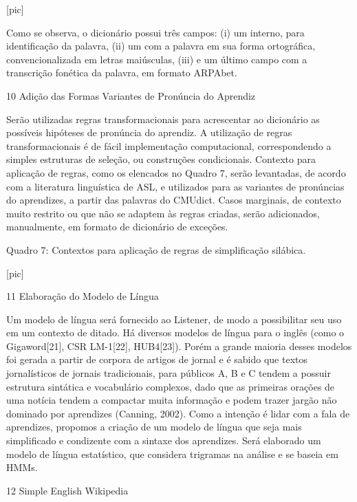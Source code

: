                                 [pic]

Como se observa, o dicion\'ario possui tr\^es campos: (i) um interno, para
identifica\c{c}\~ao da palavra, (ii) um com a palavra em sua forma
ortogr\'afica, convencionalizada em letras mai\'usculas, (iii) e um \'ultimo
campo com a transcri\c{c}\~ao fon\'etica da palavra, em formato ARPAbet.

10 Adi\c{c}\~ao das Formas Variantes de Pron\'uncia do Aprendiz

Ser\~ao utilizadas regras transformacionais para acrescentar ao dicion\'ario
as poss\'iveis hip\'oteses de pron\'uncia do aprendiz. A utiliza\c{c}\~ao de regras
transformacionais \'e de f\'acil implementa\c{c}\~ao computacional, correspondendo
a simples estruturas de sele\c{c}\~ao, ou constru\c{c}\~oes condicionais. Contexto
para aplica\c{c}\~ao de regras, como os elencados no Quadro 7, ser\~ao
levantadas, de acordo com a literatura lingu\'istica de ASL, e utilizados
para as variantes de pron\'uncias do aprendizes, a partir das palavras do
CMUdict. Casos marginais, de contexto muito restrito ou que n\~ao se
adaptem às regras criadas, ser\~ao adicionados, manualmente, em formato de
dicion\'ario de exce\c{c}\~oes.

Quadro 7: Contextos para aplica\c{c}\~ao de regras de simplifica\c{c}\~ao sil\'abica.

                                [pic]

11 Elabora\c{c}\~ao do Modelo de L\'ingua

Um modelo de l\'ingua ser\'a fornecido ao Listener, de modo a possibilitar
seu uso em um contexto de ditado. H\'a diversos modelos de l\'ingua para o
ingl\^es (como o Gigaword{[}21{]}, CSR LM-1{[}22{]}, HUB4{[}23{]}). Por\'em
a grande maioria desses modelos foi gerada a partir de corpora de
artigos de jornal e \'e sabido que textos jornal\'isticos de jornais
tradicionais, para p\'ublicos A, B e C tendem a possuir estrutura
sint\'atica e vocabul\'ario complexos, dado que as primeiras ora\c{c}\~oes de uma
not\'icia tendem a compactar muita informa\c{c}\~ao e podem trazer jarg\~ao n\~ao
dominado por aprendizes (Canning, 2002). Como a inten\c{c}\~ao \'e lidar com a
fala de aprendizes, propomos a cria\c{c}\~ao de um modelo de l\'ingua que seja
mais simplificado e condizente com a sintaxe dos aprendizes. Ser\'a
elaborado um modelo de l\'ingua estat\'istico, que considera trigramas na
an\'alise e se baseia em HMMs.

12 Simple English Wikipedia


